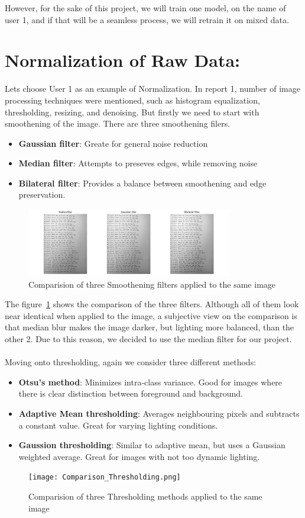 \documentclass[twoside,a4paper]{article}
\begin{document}
However, for the sake of this project, we will train one model, on the name of user 1, and if that will be a seamless process, we will retrain it on mixed data. 


\section{Normalization of Raw Data: }
Lets choose User 1 as an example of Normalization. In report 1, number of image processing techniques were mentioned, such as histogram equalization,
thresholding, resizing, and denoising. But firstly we need to start with smoothening of the image. There are three smoothening filers.
\begin{itemize}
  \item \textbf{Gaussian filter}: Greate for general noise reduction
  \item \textbf{Median filter}: Attempts to preseves edges, while removing noise
  \item \textbf{Bilateral filter}: Provides a balance between smoothening and edge preservation.
\end{itemize}
\begin{figure}[H]
  \centering
  \includegraphics[width=0.8\textwidth]{Comparison_Blues.png}
  \caption{Comparision of three Smoothening filters applied to the same image}
  \label{fig:smoothening_filters}
\end{figure}
The figure~\ref{fig:smoothening_filters} shows the comparison of the three filters. Although all of them look near identical when applied to the image, a subjective view on the comparison is that median blur makes the image darker, but lighting more balanced, than the other 2.
Due to this reason, we decided to use the median filter for our project.\\
\\
Moving onto thresholding, again we consider three different methods:
\begin{itemize}
  \item \textbf{Otsu's method}: Minimizes intra-class variance. Good for images where there is clear distinction between foreground and background.
  \item \textbf{Adaptive Mean thresholding}: Averages neighbouring pixels and subtracts a constant value. Great for varying lighting conditions.
  \item \textbf{Gaussion thresholding}: Similar to adaptive mean, but uses a Gaussian weighted average. Great for images with not too dynamic lighting.
\end{itemize}
\begin{figure}[H]
  \centering
  \texttt{[image: Comparison\_Thresholding.png]}
  \caption{Comparision of three Thresholding methods applied to the same image}
  \label{fig:thresholding_filters}
\end{figure}
\end{document}
